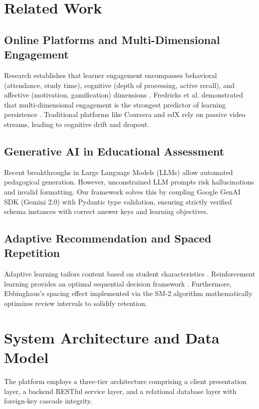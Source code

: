\documentclass[conference]{IEEEtran}
\begin{document}
\section{Related Work}
\subsection{Online Platforms and Multi-Dimensional Engagement}
Research establishes that learner engagement encompasses behavioral (attendance, study time), cognitive (depth of processing, active recall), and affective (motivation, gamification) dimensions \cite{fredricks2004}. Fredricks et al. demonstrated that multi-dimensional engagement is the strongest predictor of learning persistence \cite{fredricks2011}. Traditional platforms like Coursera and edX rely on passive video streams, leading to cognitive drift and dropout.

\subsection{Generative AI in Educational Assessment}
Recent breakthroughs in Large Language Models (LLMs) allow automated pedagogical generation. However, unconstrained LLM prompts risk hallucinations and invalid formatting. Our framework solves this by coupling Google GenAI SDK (Gemini 2.0) with Pydantic type validation, ensuring strictly verified schema instances with correct answer keys and learning objectives.

\subsection{Adaptive Recommendation and Spaced Repetition}
Adaptive learning tailors content based on student characteristics \cite{brusilovsky2001}. Reinforcement learning provides an optimal sequential decision framework \cite{sutton2018}. Furthermore, Ebbinghaus's spacing effect \cite{ebbinghaus1964} implemented via the SM-2 algorithm \cite{wozniak1994} mathematically optimizes review intervals to solidify retention.

\section{System Architecture and Data Model}
The platform employs a three-tier architecture comprising a client presentation layer, a backend RESTful service layer, and a relational database layer with foreign-key cascade integrity.
\end{document}
